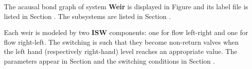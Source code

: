 

   The acausal bond graph of system \textbf{Weir} is
   displayed in Figure  and its label
   file is listed in Section .
   The subsystems are listed in Section .

Each weir is modeled by two {\bf ISW} components: one for flow
left-right and one for flow right-left. The switching is such that
they become non-return valves when the left hand (respectively
right-hand) level reaches an appropriate value. The parameters appear
in Section  and the switching conditions in
Section .
